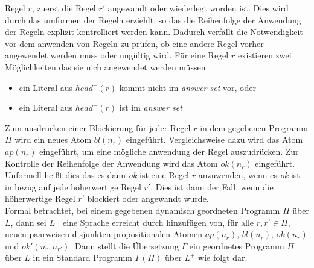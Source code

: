 Regel $r$, zuerst die Regel $r'$ angewandt oder wiederlegt worden ist.
Dies wird durch das umformen der Regeln erziehlt, so das die Reihenfolge
der Anwendung der Regeln explizit kontrolliert werden kann.
Dadurch verfällt die Notwendigkeit vor dem anwenden von Regeln zu prüfen,
ob eine andere Regel vorher angewendet werden muss oder ungültig wird.
Für eine Regel $r$ existieren zwei Möglichkeiten das sie nich angewendet werden
müssen:
\begin{itemize}
  \item ein Literal aus $head^+(r)$ kommt nicht im \emph{answer set} vor, oder
  \item ein Literal aus $head^-(r)$ ist im \emph{answer set}
\end{itemize}
Zum ausdrücken einer Blockierung für jeder Regel $r$ in dem gegebenen Programm $\Pi$
wird ein neues Atom $bl(n_r)$ eingeführt.
Vergleichsweise dazu wird das Atom $ap(n_r)$ eingeführt, um eine mögliche anwendung
der Regel auszudrücken.
Zur Kontrolle der Reihenfolge der Anwendung wird das Atom $ok(n_r)$ eingeführt.
Unformell heißt dies das es dann \emph{ok} ist eine Regel $r$ anzuwenden, wenn
es \emph{ok} ist in bezug auf jede höherwertige Regel $r'$.
Dies ist dann der Fall, wenn die höherwertige Regel $r'$ blockiert oder angewandt
wurde.\\
Formal betrachtet, bei einem gegebenen dynamisch geordneten Programm $\Pi$ über
$L$, dann sei $L^+$ eine Sprache erreicht durch hinzufügen von, für alle
$r, r' \in \Pi$, neuen paarweisen disjunkten propositionalen Atomen
$ap(n_r)$, $bl(n_r)$, $ok(n_r)$ und $ok'(n_r, n_{r'})$.
Dann stellt die Übersetzung $\Gamma$ ein geordnetes Programm $\Pi$ über $L$ in
ein Standard Programm $\Gamma(\Pi)$ über $L^+$ wie folgt dar.

